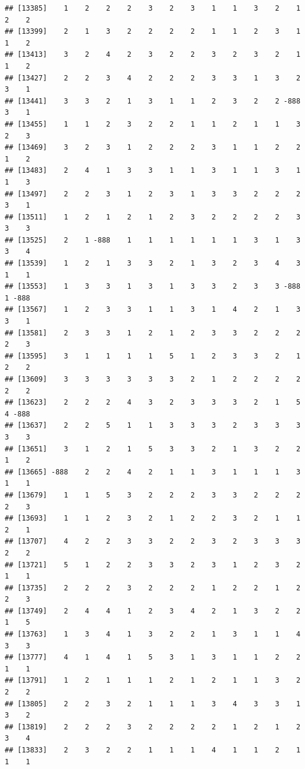 \documentclass[
  12pt,
  openany]{book}
\begin{document}
\begin{verbatim}
## [13385]    1    2    2    2    3    2    3    1    1    3    2    1    2    2
## [13399]    2    1    3    2    2    2    2    1    1    2    3    1    1    2
## [13413]    3    2    4    2    3    2    2    3    2    3    2    1    1    2
## [13427]    2    2    3    4    2    2    2    3    3    1    3    2    3    1
## [13441]    3    3    2    1    3    1    1    2    3    2    2 -888    3    1
## [13455]    1    1    2    3    2    2    1    1    2    1    1    3    2    3
## [13469]    3    2    3    1    2    2    2    3    1    1    2    2    1    2
## [13483]    2    4    1    3    3    1    1    3    1    1    3    1    1    3
## [13497]    2    2    3    1    2    3    1    3    3    2    2    2    3    1
## [13511]    1    2    1    2    1    2    3    2    2    2    2    3    3    3
## [13525]    2    1 -888    1    1    1    1    1    1    3    1    3    3    4
## [13539]    1    2    1    3    3    2    1    3    2    3    4    3    1    1
## [13553]    1    3    3    1    3    1    3    3    2    3    3 -888    1 -888
## [13567]    1    2    3    3    1    1    3    1    4    2    1    3    3    1
## [13581]    2    3    3    1    2    1    2    3    3    2    2    2    2    3
## [13595]    3    1    1    1    1    5    1    2    3    3    2    1    2    2
## [13609]    3    3    3    3    3    3    2    1    2    2    2    2    2    2
## [13623]    2    2    2    4    3    2    3    3    3    2    1    5    4 -888
## [13637]    2    2    5    1    1    3    3    3    2    3    3    3    3    3
## [13651]    3    1    2    1    5    3    3    2    1    3    2    2    1    2
## [13665] -888    2    2    4    2    1    1    3    1    1    1    3    1    1
## [13679]    1    1    5    3    2    2    2    3    3    2    2    2    2    3
## [13693]    1    1    2    3    2    1    2    2    3    2    1    1    2    1
## [13707]    4    2    2    3    3    2    2    3    2    3    3    3    2    2
## [13721]    5    1    2    2    3    3    2    3    1    2    3    2    1    1
## [13735]    2    2    2    3    2    2    2    1    2    2    1    2    2    3
## [13749]    2    4    4    1    2    3    4    2    1    3    2    2    1    5
## [13763]    1    3    4    1    3    2    2    1    3    1    1    4    3    3
## [13777]    4    1    4    1    5    3    1    3    1    1    2    2    1    1
## [13791]    1    2    1    1    1    2    1    2    1    1    3    2    2    2
## [13805]    2    2    3    2    1    1    1    3    4    3    3    1    3    2
## [13819]    2    2    2    3    2    2    2    2    1    2    1    2    3    4
## [13833]    2    3    2    2    1    1    1    4    1    1    2    1    1    1

\end{verbatim}
\end{document}
